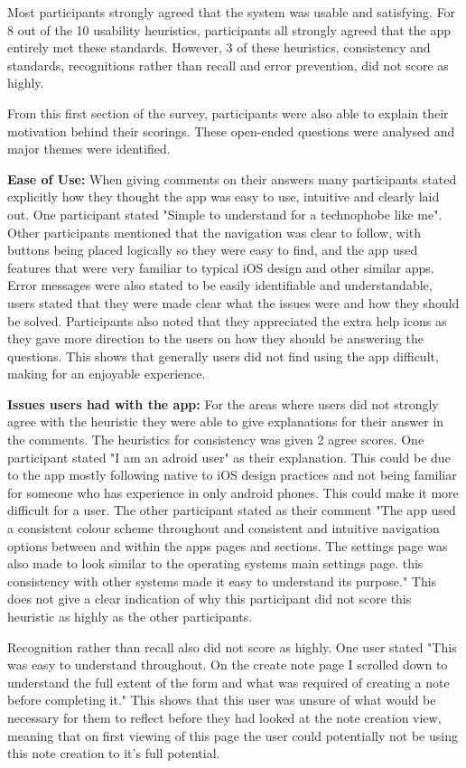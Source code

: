 \documentclass{l4proj}
\begin{document}
Most participants strongly agreed that the system was usable and satisfying. For 8 out of the 10 usability heuristics, participants all strongly agreed that the app entirely met these standards. However, 3 of these heuristics, consistency and standards, recognitions rather than recall and error prevention, did not score as highly.
 
From this first section of the survey, participants were also able to explain their motivation behind their scorings. These open-ended questions were analysed and major themes were identified.

\textbf{Ease of Use:} When giving comments on their answers many participants stated explicitly how they thought the app was easy to use, intuitive and clearly laid out. One participant stated "Simple to understand for a technophobe like me". Other participants mentioned that the navigation was clear to follow, with buttons being placed logically so they were easy to find, and the app used features that were very familiar to typical iOS design and other similar apps. Error messages were also stated to be easily identifiable and understandable, users stated that they were made clear what the issues were and how they should be solved. Participants also noted that they appreciated the extra help icons as they gave more direction to the users on how they should be answering the questions. This shows that generally users did not find using the app difficult, making for an enjoyable experience.

\textbf{Issues users had with the app:} For the areas where users did not strongly agree with the heuristic they were able to give explanations for their answer in the comments. The heuristics for consistency was given 2 agree scores. One participant stated "I am an adroid user" as their explanation. This could be due to the app mostly following native to iOS design practices and not being familiar for someone who has experience in only android phones. This could make it more difficult for a user. The other participant stated as their comment "The app used a consistent colour scheme throughout and consistent and intuitive navigation options between and within the apps pages and sections. The settings page was also made to look similar to the operating systems main settings page. this consistency with other systems made it easy to understand its purpose." This does not give a clear indication of why this participant did not score this heuristic as highly as the other participants.

Recognition rather than recall also did not score as highly. One user stated "This was easy to understand throughout. On the create note page I scrolled down to understand the full extent of the form and what was required of creating a note before completing it." This shows that this user was unsure of what would be necessary for them to reflect before they had looked at the note creation view, meaning that on first viewing of this page the user could potentially not be using this note creation to it's full potential. 
\end{document}
